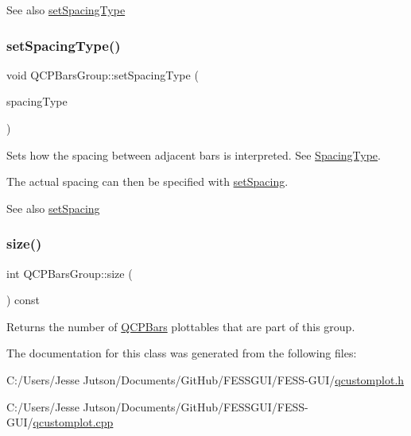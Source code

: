 \begin{DoxySeeAlso}{See also}
\hyperlink{class_q_c_p_bars_group_a2c7e2d61b10594a4555b615e1fcaf49e}{set\+Spacing\+Type} 
\end{DoxySeeAlso}
\hypertarget{class_q_c_p_bars_group_a2c7e2d61b10594a4555b615e1fcaf49e}{}\label{class_q_c_p_bars_group_a2c7e2d61b10594a4555b615e1fcaf49e} 
\subsubsection{\texorpdfstring{set\+Spacing\+Type()}{setSpacingType()}}
{\footnotesize\ttfamily void Q\+C\+P\+Bars\+Group\+::set\+Spacing\+Type (\begin{DoxyParamCaption}\item[{\hyperlink{class_q_c_p_bars_group_a4c0521120a97e60bbca37677a37075b6}{Spacing\+Type}}]{spacing\+Type }\end{DoxyParamCaption})}

Sets how the spacing between adjacent bars is interpreted. See \hyperlink{class_q_c_p_bars_group_a4c0521120a97e60bbca37677a37075b6}{Spacing\+Type}.

The actual spacing can then be specified with \hyperlink{class_q_c_p_bars_group_aa553d327479d72a0c3dafcc724a190e2}{set\+Spacing}.

\begin{DoxySeeAlso}{See also}
\hyperlink{class_q_c_p_bars_group_aa553d327479d72a0c3dafcc724a190e2}{set\+Spacing} 
\end{DoxySeeAlso}
\hypertarget{class_q_c_p_bars_group_a3780ec77919cb00840207ec7a0f00dd5}{}\label{class_q_c_p_bars_group_a3780ec77919cb00840207ec7a0f00dd5} 
\subsubsection{\texorpdfstring{size()}{size()}}
{\footnotesize\ttfamily int Q\+C\+P\+Bars\+Group\+::size (\begin{DoxyParamCaption}{ }\end{DoxyParamCaption}) const\hspace{0.3cm}{\ttfamily [inline]}}

Returns the number of \hyperlink{class_q_c_p_bars}{Q\+C\+P\+Bars} plottables that are part of this group. 

The documentation for this class was generated from the following files\+:\begin{DoxyCompactItemize}
\item 
C\+:/\+Users/\+Jesse Jutson/\+Documents/\+Git\+Hub/\+F\+E\+S\+S\+G\+U\+I/\+F\+E\+S\+S-\/\+G\+U\+I/\hyperlink{qcustomplot_8h}{qcustomplot.\+h}\item 
C\+:/\+Users/\+Jesse Jutson/\+Documents/\+Git\+Hub/\+F\+E\+S\+S\+G\+U\+I/\+F\+E\+S\+S-\/\+G\+U\+I/\hyperlink{qcustomplot_8cpp}{qcustomplot.\+cpp}\end{DoxyCompactItemize}
